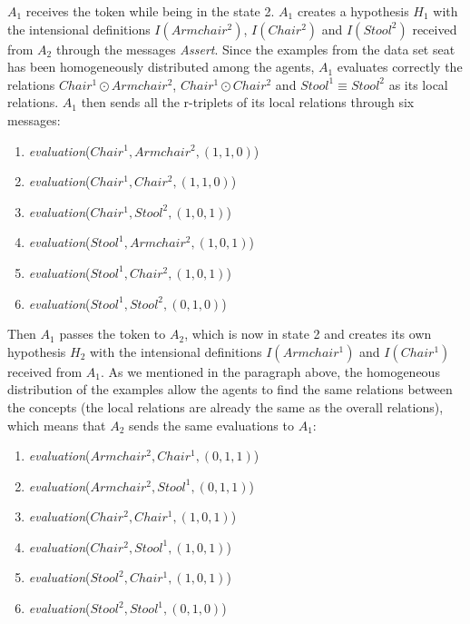 $A_{1}$ receives the token while being in the state 2. $A_{1}$ creates a hypothesis $H_{1}$ with the intensional definitions $I(Armchair^{2})$, $I(Chair^{2})$ and $I(Stool^{2})$ received from $A_{2}$ through the messages \emph{Assert}. Since the examples from the data set seat has been homogeneously distributed among the agents, $A_{1}$ evaluates correctly the relations $Chair^{1} \odot Armchair^{2}$, $Chair^{1} \odot Chair^{2}$ and $Stool^{1} \equiv Stool^{2}$ as its local relations. $A_{1}$ then sends all the r-triplets of its local relations through six messages:

\begin{multicols}{2}
\begin{enumerate}
    \item \emph{evaluation}($Chair^{1}, Armchair^{2}, (1,1,0)$)
    \item \emph{evaluation}($Chair^{1}, Chair^{2}, (1,1,0)$)
    \item \emph{evaluation}($Chair^{1}, Stool^{2}, (1,0,1)$)
    \item \emph{evaluation}($Stool^{1}, Armchair^{2}, (1,0,1)$)
    \item \emph{evaluation}($Stool^{1}, Chair^{2}, (1,0,1)$)
    \item \emph{evaluation}($Stool^{1}, Stool^{2}, (0,1,0)$)
\end{enumerate}
\end{multicols}

Then $A_{1}$ passes the token to $A_{2}$, which is now in state 2 and creates its own hypothesis $H_{2}$ with the intensional definitions $I(Armchair^{1})$ and $I(Chair^{1})$ received from $A_{1}$. As we mentioned in the paragraph above, the homogeneous distribution of the examples allow the agents to find the same relations between the concepts (the local relations are already the same as the overall relations), which means that $A_{2}$ sends the same evaluations to $A_{1}$:

\begin{multicols}{2}
\begin{enumerate}
    \item \emph{evaluation}($Armchair^{2}, Chair^{1}, (0,1,1)$)
    \item \emph{evaluation}($Armchair^{2}, Stool^{1}, (0,1,1)$)
    \item \emph{evaluation}($Chair^{2}, Chair^{1}, (1,0,1)$)
    \item \emph{evaluation}($Chair^{2}, Stool^{1}, (1,0,1)$)
    \item \emph{evaluation}($Stool^{2}, Chair^{1}, (1,0,1)$)
    \item \emph{evaluation}($Stool^{2}, Stool^{1}, (0,1,0)$)
\end{enumerate}
\end{multicols}

